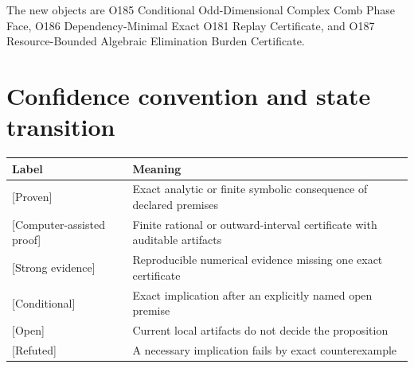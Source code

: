 \documentclass[11pt,a4paper,openany]{report}
\newcommand{\statusProven}{\textcolor{fingreen}{[Proven]}}
\newcommand{\statusCAP}{\textcolor{fingreen}{[Computer-assisted proof]}}
\newcommand{\statusStrong}{\textcolor{finblue}{[Strong evidence]}}
\newcommand{\statusConditional}{\textcolor{finviolet}{[Conditional]}}
\newcommand{\statusOpen}{\textcolor{finorange}{[Open]}}
\newcommand{\statusRefuted}{\textcolor{finred}{[Refuted]}}
\begin{document}
The new objects are O185 Conditional Odd-Dimensional Complex Comb Phase Face,
O186 Dependency-Minimal Exact O181 Replay Certificate, and O187
Resource-Bounded Algebraic Elimination Burden Certificate.

\chapter{Confidence convention and state transition}

\begin{center}\small
\begin{longtable}{@{}p{}p{}@{}}
\toprule
\textbf{Label} & \textbf{Meaning}\\ \midrule\endhead
\statusProven{} & Exact analytic or finite symbolic consequence of declared premises\\
\statusCAP{} & Finite rational or outward-interval certificate with auditable artifacts\\
\statusStrong{} & Reproducible numerical evidence missing one exact certificate\\
\statusConditional{} & Exact implication after an explicitly named open premise\\
\statusOpen{} & Current local artifacts do not decide the proposition\\
\statusRefuted{} & A necessary implication fails by exact counterexample\\
\bottomrule
\end{longtable}
\end{center}
\end{document}
